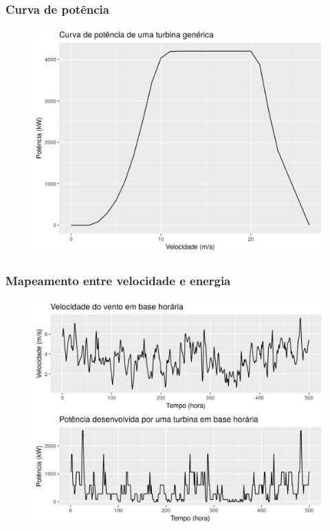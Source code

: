 \documentclass[mathserif,serif]{beamer}
\begin{document}
\begin{frame}
	\frametitle{Curva de potência}
	\begin{figure}
		\centering
		\includegraphics[scale=0.5]{power_curve}
	\end{figure}
\end{frame}

\begin{frame}
	\frametitle{Mapeamento entre velocidade e energia}
	\begin{figure}
		\centering
		\includegraphics[scale=0.6]{speed_power}
	\end{figure}
\end{frame}
\end{document}
